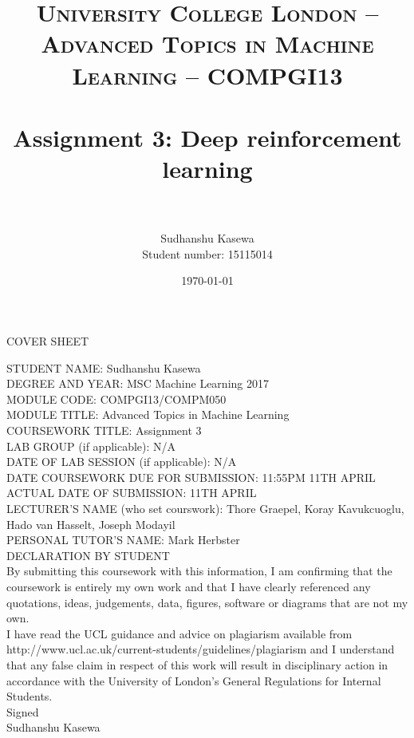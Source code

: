 \documentclass[paper=a4, fontsize=11pt]{scrartcl} %
\title{	
\normalfont \normalsize 
\textsc{University College London -- Advanced Topics in Machine Learning -- COMPGI13} \\ [25pt] %
\horrule{0.5pt} \\[0.4cm] %
\huge Assignment 3: Deep reinforcement learning\\ %
\horrule{2pt} \\[0.5cm] %
}
\author{Sudhanshu Kasewa \\[3ex] Student number: 15115014} %
\date{\normalsize\today} %
\numberwithin{equation}{section} %
\numberwithin{figure}{section} %
\numberwithin{table}{section} %
\begin{document}
\begin{center}
{\Huge COVER SHEET}\\
\end{center}


STUDENT NAME:  Sudhanshu Kasewa\\

DEGREE AND YEAR: MSC Machine Learning 2017\\

MODULE CODE: COMPGI13/COMPM050\\

MODULE TITLE: Advanced Topics in Machine Learning\\

COURSEWORK TITLE: Assignment 3\\

LAB GROUP (if applicable): N/A\\

DATE OF LAB SESSION (if applicable): N/A\\

DATE COURSEWORK DUE FOR SUBMISSION: 11:55PM 11TH APRIL\\

ACTUAL DATE OF SUBMISSION: 11TH APRIL\\

LECTURER'S NAME (who set courswork): Thore Graepel, Koray Kavukcuoglu, Hado van Hasselt, Joseph Modayil\\

PERSONAL TUTOR'S NAME: Mark Herbster\\

DECLARATION BY STUDENT \\


By submitting this coursework with this information, I am confirming that the coursework is entirely my own work  and that I have clearly referenced any quotations, ideas,  judgements, data, figures, software or diagrams that are not my own. \\


I have read the UCL guidance and advice on plagiarism available from http://www.ucl.ac.uk/current-students/guidelines/plagiarism and I understand that any false claim in respect of this work will result in disciplinary action in accordance with the University of London's General Regulations for Internal Students.\\


Signed\\

Sudhanshu Kasewa\\
\end{document}
